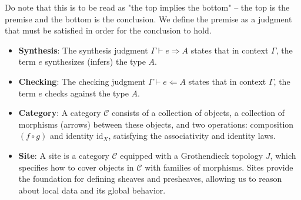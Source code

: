 \documentclass[11pt]{article}
\newcommand{\ctx}{\Gamma}
\newcommand{\synths}[3]{#1 \vdash #2 \Rightarrow #3} %
\newcommand{\checks}[3]{#1 \vdash #2 \Leftarrow #3}  %
\begin{document}
Do note that this is to be read as "the top implies the bottom" -- the top is the premise and the bottom is the conclusion.
We define the premise as a judgment that must be satisfied in order for the conclusion to hold.

\begin{itemize}
    \item \textbf{Synthesis}: The synthesis judgment $\synths{\ctx}{e}{A}$ states that in context $\ctx$, the term $e$ synthesizes (infers) the type $A$.
    \item \textbf{Checking}: The checking judgment $\checks{\ctx}{e}{A}$ states that in context $\ctx$, the term $e$ checks against the type $A$.
    \item \textbf{Category}: A category $\mathcal{C}$ consists of a collection of objects, a collection of morphisms (arrows) between these objects, and two operations:
          composition $(f \circ g)$ and identity $\text{id}_X$, satisfying the associativity and identity laws.
    \item \textbf{Site}: A site is a category $\mathcal{C}$ equipped with a Grothendieck topology $J$, which specifies how to cover objects in $\mathcal{C}$ with families of morphisms. Sites provide the foundation for defining sheaves and presheaves, allowing us to reason about local data and its global behavior.
\end{itemize}
\end{document}
